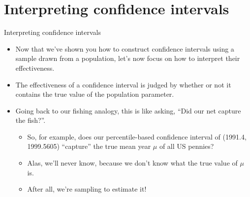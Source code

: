 \documentclass[
  ignorenonframetext,
]{beamer}
\providecommand{\tightlist}{%
  \setlength{\itemsep}{0pt}\setlength{\parskip}{0pt}}
\begin{document}
\hypertarget{interpreting-confidence-intervals}{%
\section{Interpreting confidence
intervals}\label{interpreting-confidence-intervals}}

\begin{frame}{Interpreting confidence intervals}
\protect\hypertarget{interpreting-confidence-intervals-1}{}
\begin{itemize}
\item
  Now that we've shown you how to construct confidence intervals using a
  sample drawn from a population, let's now focus on how to interpret
  their effectiveness.
\item
  The effectiveness of a confidence interval is judged by whether or not
  it contains the true value of the population parameter.
\item
  Going back to our fishing analogy, this is like asking, ``Did our net
  capture the fish?''.

  \begin{itemize}
  \tightlist
  \item
    So, for example, does our percentile-based confidence interval of
    (1991.4, 1999.5605) ``capture'' the true mean year \(\mu\) of all US
    pennies?
  \item
    Alas, we'll never know, because we don't know what the true value of
    \(\mu\) is.
  \item
    After all, we're sampling to estimate it!
  \end{itemize}
\end{itemize}
\end{frame}
\end{document}
